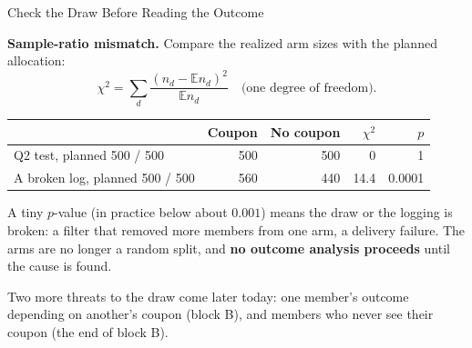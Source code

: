 \documentclass[aspectratio=169, 11pt, handout]{beamer}
\newcommand{\E}{\mathbb{E}}
\begin{document}
\begin{frame}{Check the Draw Before Reading the Outcome}

\textbf{Sample-ratio mismatch.} Compare the realized arm sizes with the planned allocation:
\[
\chi^2 = \sum_d \frac{(n_d - \E n_d)^2}{\E n_d} \quad \text{(one degree of freedom)}.
\]

\begin{center}
\begin{tabular}{lrrrr}
\toprule
& \textbf{Coupon} & \textbf{No coupon} & $\chi^2$ & $p$ \\
\midrule
Q2 test, planned 500 / 500 & 500 & 500 & 0 & 1 \\
A broken log, planned 500 / 500 & 560 & 440 & 14.4 & 0.0001 \\
\bottomrule
\end{tabular}
\end{center}

A tiny $p$-value (in practice below about $0.001$) means the draw or the logging is broken: a filter that removed more members from one arm, a delivery failure. The arms are no longer a random split, and \textbf{no outcome analysis proceeds} until the cause is found.

\bigskip

\small Two more threats to the draw come later today: one member's outcome depending on another's coupon (block B), and members who never see their coupon (the end of block B).
\end{frame}
\end{document}
